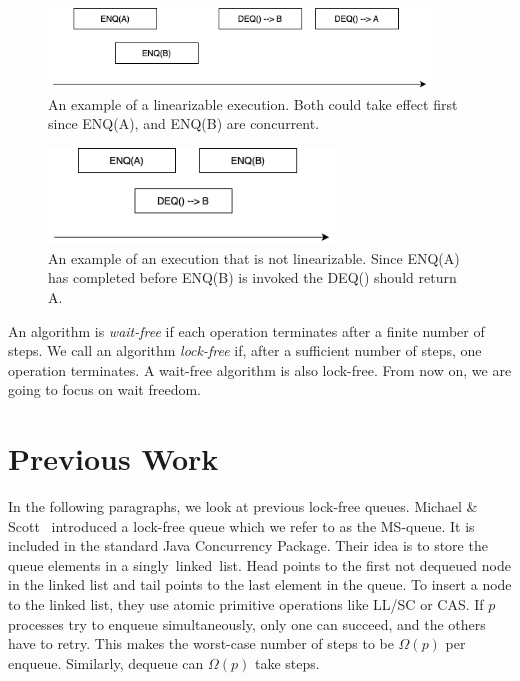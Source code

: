 \documentclass[12pt]{article}
\begin{document}
\begin{figure}[hbt]
  \center\includegraphics[width=4in]{pics/good}
  \caption{An example of a linearizable execution. Both could take effect first since ENQ(A), and ENQ(B) are concurrent.}
\end{figure}

\begin{figure}[hbt]
  \center\includegraphics[width=3in]{pics/bad}
  \caption{An example of an execution that is not linearizable. Since ENQ(A) has completed before ENQ(B) is invoked the DEQ() should return A.}
\end{figure}


An algorithm is \textit{wait-free} if each operation terminates after a finite number of steps. We call an algorithm \textit{lock-free} if, after a sufficient number of steps, one operation terminates. A wait-free algorithm is also lock-free. From now on, we are going to focus on wait freedom.


\section{Previous Work}

In the following paragraphs, we look at previous lock-free queues.
Michael \& Scott~\cite{DBLP:conf/podc/MichaelS96} introduced a lock-free queue which we refer to as the MS-queue. It is included in the standard Java Concurrency Package. Their idea is to store the queue elements in a singly~linked~list. Head points to the first not dequeued node in the linked list and tail points to the last element in the queue. To insert a node to the linked list, they use atomic primitive operations like LL/SC or CAS. If $p$ processes try to enqueue simultaneously, only one can succeed, and the others have to retry. This makes the worst-case number of steps to be $\Omega(p)$ per enqueue. Similarly, dequeue can $\Omega(p)$ take steps.
\end{document}
